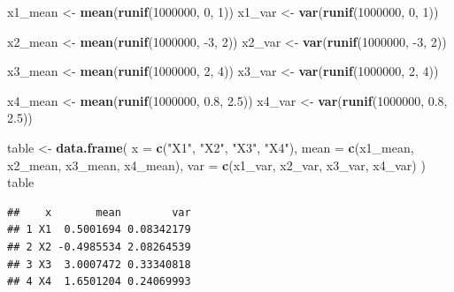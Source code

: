 \documentclass[
]{article}
\newenvironment{Shaded}{\begin{snugshade}}{\end{snugshade}}
\newcommand{\DataTypeTok}[1]{\textcolor[rgb]{0.13,0.29,0.53}{#1}}
\newcommand{\DecValTok}[1]{\textcolor[rgb]{0.00,0.00,0.81}{#1}}
\newcommand{\FloatTok}[1]{\textcolor[rgb]{0.00,0.00,0.81}{#1}}
\newcommand{\KeywordTok}[1]{\textcolor[rgb]{0.13,0.29,0.53}{\textbf{#1}}}
\newcommand{\NormalTok}[1]{#1}
\newcommand{\StringTok}[1]{\textcolor[rgb]{0.31,0.60,0.02}{#1}}
\begin{document}
\begin{Shaded}
\begin{Highlighting}[]
\NormalTok{x1\_mean \textless{}{-}}\StringTok{ }\KeywordTok{mean}\NormalTok{(}\KeywordTok{runif}\NormalTok{(}\DecValTok{1000000}\NormalTok{, }\DecValTok{0}\NormalTok{, }\DecValTok{1}\NormalTok{))}
\NormalTok{x1\_var \textless{}{-}}\StringTok{ }\KeywordTok{var}\NormalTok{(}\KeywordTok{runif}\NormalTok{(}\DecValTok{1000000}\NormalTok{, }\DecValTok{0}\NormalTok{, }\DecValTok{1}\NormalTok{))}

\NormalTok{x2\_mean \textless{}{-}}\StringTok{ }\KeywordTok{mean}\NormalTok{(}\KeywordTok{runif}\NormalTok{(}\DecValTok{1000000}\NormalTok{, }\DecValTok{{-}3}\NormalTok{, }\DecValTok{2}\NormalTok{))}
\NormalTok{x2\_var \textless{}{-}}\StringTok{ }\KeywordTok{var}\NormalTok{(}\KeywordTok{runif}\NormalTok{(}\DecValTok{1000000}\NormalTok{, }\DecValTok{{-}3}\NormalTok{, }\DecValTok{2}\NormalTok{))}

\NormalTok{x3\_mean \textless{}{-}}\StringTok{ }\KeywordTok{mean}\NormalTok{(}\KeywordTok{runif}\NormalTok{(}\DecValTok{1000000}\NormalTok{, }\DecValTok{2}\NormalTok{, }\DecValTok{4}\NormalTok{))}
\NormalTok{x3\_var \textless{}{-}}\StringTok{ }\KeywordTok{var}\NormalTok{(}\KeywordTok{runif}\NormalTok{(}\DecValTok{1000000}\NormalTok{, }\DecValTok{2}\NormalTok{, }\DecValTok{4}\NormalTok{))}

\NormalTok{x4\_mean \textless{}{-}}\StringTok{ }\KeywordTok{mean}\NormalTok{(}\KeywordTok{runif}\NormalTok{(}\DecValTok{1000000}\NormalTok{, }\FloatTok{0.8}\NormalTok{, }\FloatTok{2.5}\NormalTok{))}
\NormalTok{x4\_var \textless{}{-}}\StringTok{ }\KeywordTok{var}\NormalTok{(}\KeywordTok{runif}\NormalTok{(}\DecValTok{1000000}\NormalTok{, }\FloatTok{0.8}\NormalTok{, }\FloatTok{2.5}\NormalTok{))}

\NormalTok{table \textless{}{-}}\StringTok{ }\KeywordTok{data.frame}\NormalTok{(}
  \DataTypeTok{x =} \KeywordTok{c}\NormalTok{(}\StringTok{"X1"}\NormalTok{, }\StringTok{"X2"}\NormalTok{, }\StringTok{"X3"}\NormalTok{, }\StringTok{"X4"}\NormalTok{),}
  \DataTypeTok{mean =} \KeywordTok{c}\NormalTok{(x1\_mean, x2\_mean, x3\_mean, x4\_mean),}
  \DataTypeTok{var =} \KeywordTok{c}\NormalTok{(x1\_var, x2\_var, x3\_var, x4\_var)}
\NormalTok{)}
\NormalTok{table}
\end{Highlighting}
\end{Shaded}

\begin{verbatim}
##    x       mean        var
## 1 X1  0.5001694 0.08342179
## 2 X2 -0.4985534 2.08264539
## 3 X3  3.0007472 0.33340818
## 4 X4  1.6501204 0.24069993
\end{verbatim}
\end{document}
